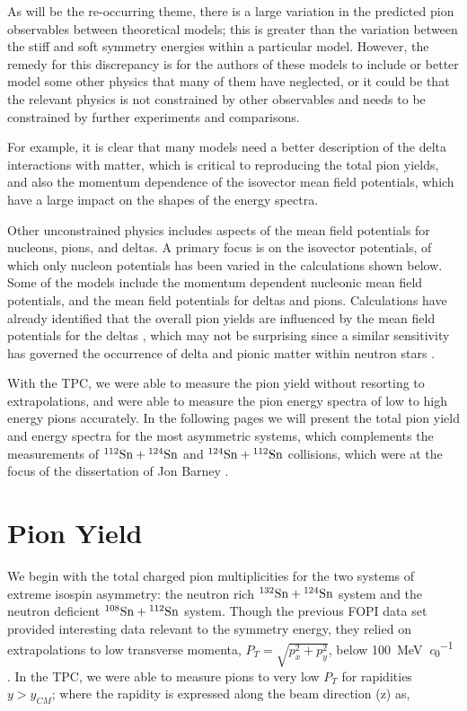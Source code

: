 As will be the re-occurring theme, there is a large variation in the predicted pion observables between theoretical models; this is greater than the variation between the stiff and soft symmetry energies within a particular model. However, the remedy for this discrepancy is for the authors of these models to include or better model some other physics that many of them have neglected, or it could be that the relevant physics is not constrained by other observables and needs to be constrained by further experiments and comparisons.

For example, it is clear that many models need a  better description of the delta interactions with matter, which is critical to reproducing the total pion yields, and also the momentum dependence of the isovector mean field potentials, which have a large impact on the shapes of the energy spectra. 

Other unconstrained physics includes aspects of the mean field potentials for nucleons, pions, and deltas. A primary focus is on the isovector potentials, of which only nucleon potentials has been varied in the calculations shown below. Some of the models include the momentum dependent nucleonic mean field potentials, and the mean field potentials for deltas and pions. Calculations have already identified that the overall pion yields are influenced by the mean field potentials for the deltas \cite{cozmaPC}, which may not be surprising since a similar sensitivity has governed the occurrence of delta and pionic matter within neutron stars \cite{deltaNS,pionNS}.  

With the \spirit TPC, we were able to measure the pion yield without resorting to extrapolations, and were able to measure the pion energy spectra of low to high energy pions accurately. In the following pages we will present the total pion yield and energy spectra for the most asymmetric systems, which complements the measurements of ${}^{112}\mathrm{Sn} + {}^{124}\mathrm{Sn}$ and ${}^{124}\mathrm{Sn} + {}^{112}\mathrm{Sn}$ collisions, which were at the focus of the dissertation of Jon Barney \cite{jon}.


\section{Pion Yield}

We begin with the total charged pion multiplicities for the two systems of extreme isospin asymmetry: the neutron rich ${}^{132}\mathrm{Sn} + {}^{124}\mathrm{Sn}$ system and the neutron deficient  ${}^{108}\mathrm{Sn} + {}^{112}\mathrm{Sn}$ system. Though the previous FOPI data set provided interesting data relevant to  the symmetry energy, they relied on extrapolations to low transverse momenta, $P_T = \sqrt{p_x^2 + p_y^2}$, below \SI{100}{\mega\electronvolt\per\clight} \cite{fopi}. In the \spirit TPC, we were able to measure pions to very low $P_T$ for rapidities $y > y_{CM}$; where the rapidity is expressed along the beam direction (z) as,


